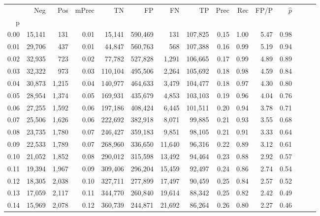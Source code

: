 \begin{tabular}{rrrrrrrrrrrrrrr}
\toprule
{} &     Neg &    Pos & mPrec &       TN &       FP &       FN &       TP &  Prec &   Rec &  FP/P & $\hat{p}$ \\
p    &         &        &       &          &          &          &          &       &       &       &           \\
\midrule
0.00 &  15,141 &    131 &  0.01 &   15,141 &  590,469 &      131 &  107,825 &  0.15 &  1.00 &  5.47 &      0.98 \\
0.01 &  29,706 &    437 &  0.01 &   44,847 &  560,763 &      568 &  107,388 &  0.16 &  0.99 &  5.19 &      0.94 \\
0.02 &  32,935 &    723 &  0.02 &   77,782 &  527,828 &    1,291 &  106,665 &  0.17 &  0.99 &  4.89 &      0.89 \\
0.03 &  32,322 &    973 &  0.03 &  110,104 &  495,506 &    2,264 &  105,692 &  0.18 &  0.98 &  4.59 &      0.84 \\
0.04 &  30,873 &  1,215 &  0.04 &  140,977 &  464,633 &    3,479 &  104,477 &  0.18 &  0.97 &  4.30 &      0.80 \\
0.05 &  28,954 &  1,374 &  0.05 &  169,931 &  435,679 &    4,853 &  103,103 &  0.19 &  0.96 &  4.04 &      0.76 \\
0.06 &  27,255 &  1,592 &  0.06 &  197,186 &  408,424 &    6,445 &  101,511 &  0.20 &  0.94 &  3.78 &      0.71 \\
0.07 &  25,506 &  1,626 &  0.06 &  222,692 &  382,918 &    8,071 &   99,885 &  0.21 &  0.93 &  3.55 &      0.68 \\
0.08 &  23,735 &  1,780 &  0.07 &  246,427 &  359,183 &    9,851 &   98,105 &  0.21 &  0.91 &  3.33 &      0.64 \\
0.09 &  22,533 &  1,789 &  0.07 &  268,960 &  336,650 &   11,640 &   96,316 &  0.22 &  0.89 &  3.12 &      0.61 \\
0.10 &  21,052 &  1,852 &  0.08 &  290,012 &  315,598 &   13,492 &   94,464 &  0.23 &  0.88 &  2.92 &      0.57 \\
0.11 &  19,394 &  1,967 &  0.09 &  309,406 &  296,204 &   15,459 &   92,497 &  0.24 &  0.86 &  2.74 &      0.54 \\
0.12 &  18,305 &  2,038 &  0.10 &  327,711 &  277,899 &   17,497 &   90,459 &  0.25 &  0.84 &  2.57 &      0.52 \\
0.13 &  17,059 &  2,117 &  0.11 &  344,770 &  260,840 &   19,614 &   88,342 &  0.25 &  0.82 &  2.42 &      0.49 \\
0.14 &  15,969 &  2,078 &  0.12 &  360,739 &  244,871 &   21,692 &   86,264 &  0.26 &  0.80 &  2.27 &      0.46 \\

\end{tabular}
